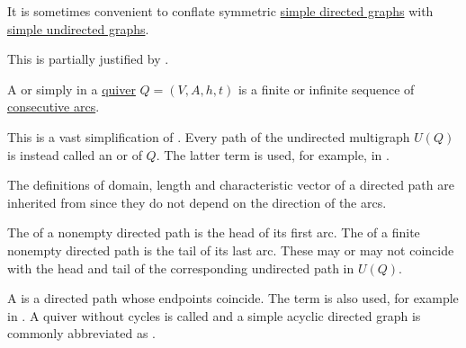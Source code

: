 \begin{remark}\label{rem:symmetric_directed_graphs}
  It is sometimes convenient to conflate symmetric \hyperref[def:quiver/simple]{simple directed graphs} with \hyperref[def:undirected_graph]{simple undirected graphs}.

  This is partially justified by .
\end{remark}

\begin{definition}\label{def:quiver_path}
  A  or simply  in a \hyperref[def:quiver]{quiver} \( Q = (V, A, h, t) \) is a finite or infinite sequence of \hyperref[def:quiver/adjacency]{consecutive arcs}.

  This is a vast simplification of . Every path of the undirected multigraph \( U(Q) \) is instead called an  or  of \( Q \). The latter term is used, for example, in \cite[ch. 1, sec. 3.2]{GondranMinoux1984Graphs}.

  The definitions of domain, length and characteristic vector of a directed path are inherited from  since they do not depend on the direction of the arcs.

  The  of a nonempty directed path is the head of its first arc. The  of a finite nonempty directed path is the tail of its last arc. These may or may not coincide with the head and tail of the corresponding undirected path in \( U(Q) \).

  A  is a directed path whose endpoints coincide. The term  is also used, for example in \cite[ch. 1, sec. 3.2]{GondranMinoux1984Graphs}. A quiver without cycles is called  and a simple acyclic directed graph is commonly abbreviated as .
\end{definition}


